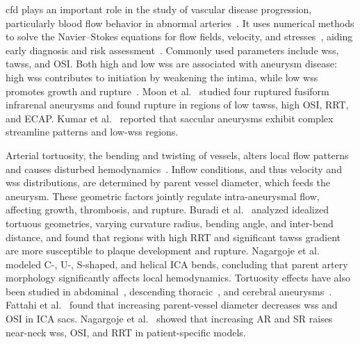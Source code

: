 \documentclass[12pt,a4paper]{article}
\newcommand{\WSS}{\ac{wss}\xspace}
\newcommand{\TAWSS}{\ac{tawss}\xspace}
\newcommand{\OSI}{\ac{OSI}\xspace}
\newcommand{\ICA}{\ac{ICA}\xspace}
\newcommand{\AR}{\ac{AR}\xspace}
\newcommand{\SR}{\ac{SR}\xspace}
\newcommand{\RRT}{\ac{RRT}\xspace}
\newcommand{\ECAP}{\ac{ECAP}\xspace}
\newcommand{\CFDcap}{\Ac{cfd}\xspace}
\theoremstyle{definition}
\numberwithin{equation}{section}
\begin{document}
\CFDcap plays an important role in the study of vascular disease progression, particularly blood flow behavior in abnormal arteries~\cite{lee2011computational}. It uses numerical methods to solve the Navier--Stokes equations for flow fields, velocity, and stresses~\cite{navier1823memoire, stokes2007theories}, aiding early diagnosis and risk assessment~\cite{morris2016computational}. Commonly used parameters include \WSS, \TAWSS, and \OSI. Both high and low \WSS are associated with aneurysm disease: high \WSS contributes to initiation by weakening the intima, while low \WSS promotes growth and rupture~\cite{geers2017wall}. Moon et al.~\cite{moon2025hemodynamic} studied four ruptured fusiform infrarenal aneurysms and found rupture in regions of low \TAWSS, high \OSI, \RRT, and \ECAP. Kumar et al.~\cite{SK1} reported that saccular aneurysms exhibit complex streamline patterns and low-\WSS regions.

Arterial tortuosity, the bending and twisting of vessels, alters local flow patterns and causes disturbed hemodynamics~\cite{9a}. Inflow conditions, and thus velocity and \WSS distributions, are determined by parent vessel diameter, which feeds the aneurysm. These geometric factors jointly regulate intra-aneurysmal flow, affecting growth, thrombosis, and rupture. Buradi et al.~\cite{10a} analyzed idealized tortuous geometries, varying curvature radius, bending angle, and inter-bend distance, and found that regions with high \RRT and significant \TAWSS gradient are more susceptible to plaque development and rupture. Nagargoje et al.~\cite{11a} modeled C-, U-, S-shaped, and helical \ICA bends, concluding that parent artery morphology significantly affects local hemodynamics. Tortuosity effects have also been studied in abdominal~\cite{12a}, descending thoracic~\cite{13a}, and cerebral aneurysms~\cite{14a}. Fattahi et al.~\cite{fattahi2023influence, fattahi2023usage} found that increasing parent-vessel diameter decreases \WSS and \OSI in \ICA sacs. Nagargoje et al.~\cite{nagargoje2022influence} showed that increasing \AR and \SR raises near-neck \WSS, \OSI, and \RRT in patient-specific models.
\end{document}
